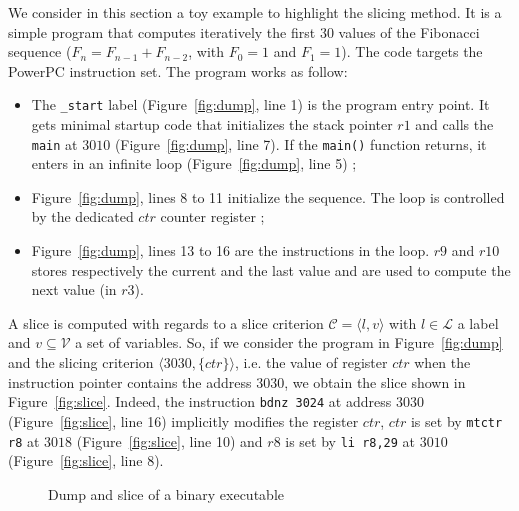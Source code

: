   We consider in this section a toy example to highlight the slicing method. It
  is a simple program that computes iteratively the first 30 values of the
  Fibonacci sequence ($F_{n}=F_{n-1}+F_{n-2}$, with $F_{0}=1$ and $F_{1}=1$).
  The code targets the PowerPC instruction set. The program works as follow:
  \begin{itemize}
    \item The \texttt{\_start} label (Figure~\ref{fig:dump}, line 1) is the
      program entry point. It gets minimal startup code that initializes the
      stack pointer $r1$ and calls the \texttt{main} at $3010$
      (Figure~\ref{fig:dump}, line 7). If the \texttt{main()} function returns,
      it enters in an infinite loop (Figure~\ref{fig:dump}, line 5) ;
    \item Figure~\ref{fig:dump}, lines 8 to 11 initialize the sequence. The loop
      is controlled by the dedicated $ctr$ counter register ;
    \item Figure~\ref{fig:dump}, lines 13 to 16 are the instructions in the
      loop. $r9$ and $r10$ stores respectively the current and the last value
      and are used to compute the next value (in $r3$).
  \end{itemize}
  
  A slice is computed with regards to a slice criterion $\mathcal{C} = \langle
  l, v \rangle$ with $l \in \mathcal{L}$ a label and $v \subseteq \mathcal{V}$ a
  set of variables. So, if we consider the program in Figure~\ref{fig:dump} and
  the slicing criterion $\langle 3030, \{ctr\} \rangle$, i.e. the value of
  register $ctr$ when the instruction pointer contains the address $3030$, we
  obtain the slice shown in Figure~\ref{fig:slice}. Indeed, the instruction
  \verb|bdnz 3024| at address $3030$ (Figure~\ref{fig:slice}, line 16)
  implicitly modifies the register $ctr$, $ctr$ is set by \verb|mtctr r8| at
  $3018$ (Figure~\ref{fig:slice}, line 10) and $r8$ is set by \verb|li r8,29| at
  $3010$ (Figure~\ref{fig:slice}, line 8).
  
  \begin{figure}[ht]
    \centering\scriptsize
    \hfill
    \subfloat[slice of \texttt{fibcall-O2.elf} for $\mathcal{C} = \langle 3030, \{ ctr \} \rangle$]{
       
      \label{fig:slice}}
    \caption{Dump and slice of a binary executable}
  \end{figure}
  
